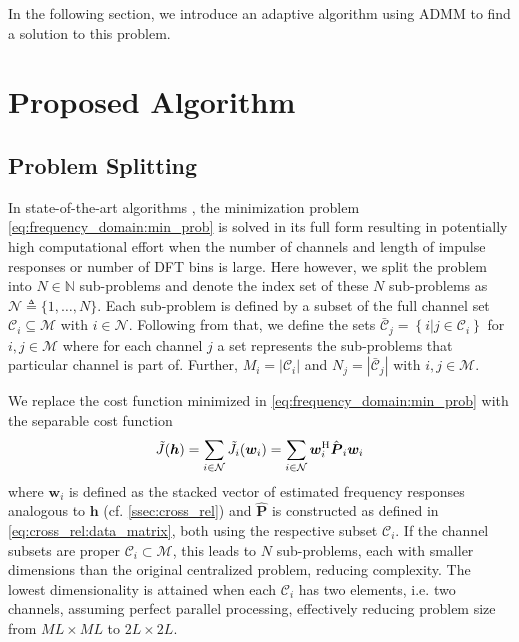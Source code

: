 \documentclass{article}
\newcommand{\hf}{{\bm{h}}}
\newcommand{\wf}{{\bm{w}}}
\newcommand{\aRhof}{{\bm{{P}}}}
\newcommand{\Cset}{\mathcal{C}}
\newcommand{\Csetb}{\bar{\mathcal{C}}}
\newcommand{\Mset}{\mathcal{M}}
\newcommand{\Nset}{\mathcal{N}}
\begin{document}
In the following section, we introduce an adaptive algorithm using ADMM to find a solution to this problem.

\section{Proposed Algorithm}
\label{sec:proposed_method}

\subsection{Problem Splitting}
\label{ssec:problem_splitting}
In state-of-the-art algorithms \cite{heNoiseRobustFrequencyDomain2018,habetsOnlineQuasiNewtonAlgorithm2010}, the minimization problem \eqref{eq:frequency_domain:min_prob} is solved in its full form resulting in potentially high computational effort when the number of channels and length of impulse responses or number of DFT bins is large.
Here however, we split the problem into \(N \in \mathbb{N}\) sub-problems and denote the index set of these \(N\) sub-problems as \(\Nset \triangleq \{1,\ldots,N\}\).
Each sub-problem is defined by a subset of the full channel set \(\Cset_i \subseteq \Mset\) with \(i \in \Nset\).
Following from that, we define the sets \(\Csetb_j = \left\{ i \vert j \in \Cset_i \right\}\) for \(i,j \in \Mset\) where for each channel \(j\) a set represents the sub-problems that particular channel is part of.
Further, \(M_i = \left| \Cset_i \right| \) and \(N_j = \left| \Csetb_j \right| \) with \(i,j \in \Mset\).

We replace the cost function minimized in \eqref{eq:frequency_domain:min_prob} with the separable cost function 
\begin{equation}
    \tilde{J}(\hf) = \sum_{i \in \Nset} \tilde{J}_i(\wf_i)  = \sum_{i \in \Nset} \wf_i^\herm \hat{\aRhof}_i \wf_i
    \label{eq:problem_splitting:cost_function}
\end{equation}
where \(\wf_i\) is defined as the stacked vector of estimated frequency responses analogous to \(\hf\) (cf. \autoref{ssec:cross_rel}) and \(\hat{\aRhof}\) is constructed as defined in \eqref{eq:cross_rel:data_matrix}, both using the respective subset \(\Cset_i\).
If the channel subsets are proper \(\Cset_i \subset \Mset\), this leads to \(N\) sub-problems, each with smaller dimensions than the original centralized problem, reducing complexity.
The lowest dimensionality is attained when each \(\Cset_i\) has two elements, i.e. two channels, assuming perfect parallel processing, effectively reducing problem size from \(ML \times ML\) to \(2L \times 2L\).
\end{document}
